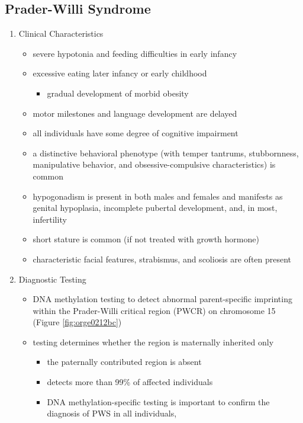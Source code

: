 \documentclass[12pt]{scrartcl}
\begin{document}
\subsection{Prader-Willi Syndrome}
\label{sec:org7e070cb}
\begin{enumerate}
\item Clinical Characteristics
\label{sec:org42a0700}
\begin{itemize}
\item severe hypotonia and feeding difficulties in early infancy
\item excessive eating later infancy or early childhood
\begin{itemize}
\item gradual development of morbid obesity
\end{itemize}
\item motor milestones and language development are delayed
\item all individuals have some degree of cognitive impairment
\item a distinctive behavioral phenotype (with temper tantrums,
stubbornness, manipulative behavior, and obsessive-compulsive
characteristics) is common
\item hypogonadism is present in both males and females and manifests as
genital hypoplasia, incomplete pubertal development, and, in most,
infertility
\item short stature is common (if not treated with growth hormone)
\item characteristic facial features, strabismus, and scoliosis are often
present
\end{itemize}

\item Diagnostic Testing
\label{sec:org67b61cf}
\begin{itemize}
\item DNA methylation testing to detect abnormal parent-specific
imprinting within the Prader-Willi critical region (PWCR) on
chromosome 15 (Figure \ref{fig:orge0212bc})
\item testing determines whether the region is maternally inherited only
\begin{itemize}
\item the paternally contributed region is absent
\item detects more than 99\% of affected individuals
\item DNA methylation-specific testing is important to confirm the
diagnosis of PWS in all individuals,
\end{itemize}
\end{itemize}


\end{enumerate}
\end{document}
